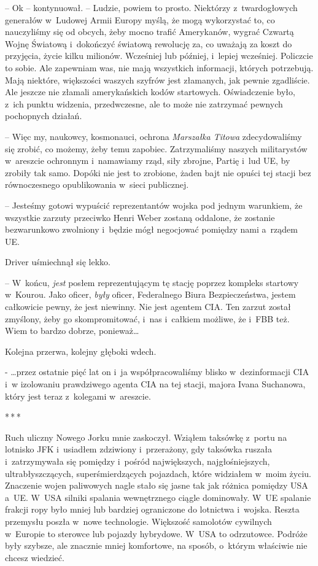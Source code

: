 \documentclass[oneside,polish,12pt,sfheadings]{mwbk}
\newcommand{\threeast}{\bigskip\par\centerline{*\,*\,*}\medskip\par}%
\begin{document}
-- Ok -- kontynuował. -- Ludzie, powiem to prosto. Niektórzy z~twardogłowych generałów w~Ludowej Armii Europy myślą, że mogą
wykorzystać to, co nauczyliśmy się od obcych, żeby mocno trafić
Amerykanów, wygrać Czwartą Wojnę Światową i~dokończyć światową rewolucję
za, co uważają za koszt do przyjęcia, życie kilku milionów. Wcześniej
lub później, i~lepiej wcześniej. Policzcie to sobie. Ale zapewniam was,
nie mają wszystkich informacji, których potrzebują. Mają niektóre,
większości waszych szyfrów jest złamanych, jak pewnie zgadliście. Ale
jeszcze nie złamali amerykańskich kodów startowych. Oświadczenie było, z~ich punktu widzenia, przedwczesne, ale to może nie zatrzymać pewnych
pochopnych działań.

-- Więc my, naukowcy, kosmonauci, ochrona \emph{Marszałka Titowa}
zdecydowaliśmy się zrobić, co możemy, żeby temu zapobiec. Zatrzymaliśmy
naszych militarystów w~areszcie ochronnym i~namawiamy rząd, siły
zbrojne, Partię i~lud UE, by zrobiły tak samo. Dopóki nie jest to
zrobione, żaden bajt nie opuści tej stacji bez równoczesnego
opublikowania w~sieci publicznej.

-- Jesteśmy gotowi wypuścić reprezentantów wojska pod jednym warunkiem,
że wszystkie zarzuty przeciwko Henri Weber zostaną oddalone, że zostanie
bezwarunkowo zwolniony i~będzie mógł negocjować pomiędzy nami a~rządem
UE.

Driver uśmiechnął się lekko. 

-- W~końcu, \emph{jest} posłem reprezentującym
tę stację poprzez kompleks startowy w~Kourou. Jako oficer, \emph{były}
oficer, Federalnego Biura Bezpieczeństwa, jestem całkowicie pewny, że
jest niewinny. Nie jest agentem CIA. Ten zarzut został zmyślony, żeby go
skompromitować, i~nas i~całkiem możliwe, że i~FBB też. Wiem to bardzo
dobrze, ponieważ\ldots

Kolejna przerwa, kolejny głęboki wdech.

- \ldots przez ostatnie pięć lat on i~ja współpracowaliśmy blisko w~dezinformacji CIA i~w izolowaniu prawdziwego agenta CIA na tej stacji,
majora Ivana Suchanowa, który jest teraz z~kolegami w~areszcie.

\threeast

Ruch uliczny Nowego Jorku mnie zaskoczył. Wziąłem taksówkę z~portu na
lotnisko JFK i~usiadłem zdziwiony i~przerażony, gdy taksówka ruszała i~zatrzymywała się pomiędzy i~pośród największych, najgłośniejszych,
ultrabłyszczących, superśmierdzących pojazdach, które widziałem w~moim
życiu. Znaczenie wojen paliwowych nagle stało się jasne tak jak różnica
pomiędzy USA a~UE. W~USA silniki spalania wewnętrznego ciągle
dominowały. W~UE spalanie frakcji ropy było mniej lub bardziej
ograniczone do lotnictwa i~wojska. Reszta przemysłu poszła w~nowe
technologie. Większość samolotów cywilnych w~Europie to sterowce lub
pojazdy hybrydowe. W~USA to odrzutowce. Podróże były szybsze, ale
znacznie mniej komfortowe, na sposób, o~którym właściwie nie chcesz
wiedzieć.
\end{document}

